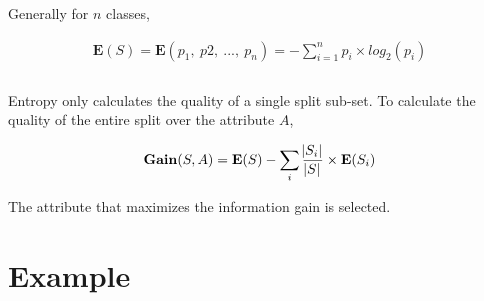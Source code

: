 \documentclass[11pt, a4paper]{article}
\begin{document}
Generally for $n$ classes,

\begin{align*}
	\mathbf{E}(S) = \mathbf{E}(p_1,\ p2,\ ...,\ p_n) = -\sum_{i=1}^{n} p_i \times log_2(p_i) \\
	                                                                                         \\
\end{align*}

Entropy only calculates the quality of a single split sub-set. To calculate the quality of the entire split over the attribute $A$, 

\begin{align*}
	\mathbf{Gain}(S, A) = \mathbf{E}(S) -\sum_i \frac{\abs{S_i}}{\abs{S}} \times \mathbf{E}(S_i) 
\end{align*}

The attribute that maximizes the information gain is selected.

\section{Example}
\end{document}
